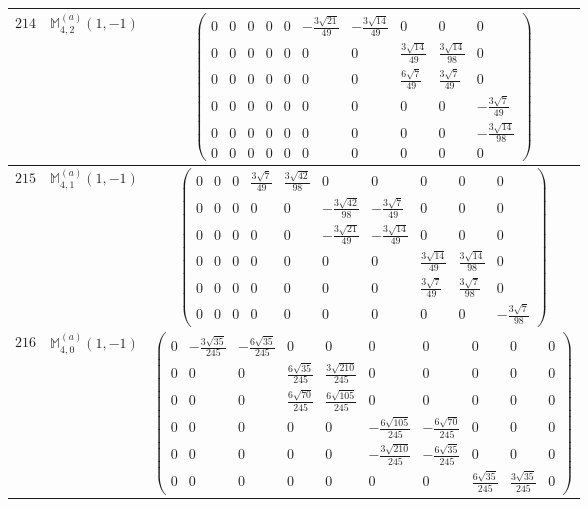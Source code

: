 \documentclass[fleqn,8pt,landscape]{jsarticle}
\begin{document}
\begin{center}
\begin{longtable}{ccc}
$ 214 $ & $ \mathbb{M}_{4,2}^{(a)}(1,-1) $ & $ \begin{pmatrix} 0 & 0 & 0 & 0 & 0 & - \frac{3 \sqrt{21}}{49} & - \frac{3 \sqrt{14}}{49} & 0 & 0 & 0 \\ 0 & 0 & 0 & 0 & 0 & 0 & 0 & \frac{3 \sqrt{14}}{49} & \frac{3 \sqrt{14}}{98} & 0 \\ 0 & 0 & 0 & 0 & 0 & 0 & 0 & \frac{6 \sqrt{7}}{49} & \frac{3 \sqrt{7}}{49} & 0 \\ 0 & 0 & 0 & 0 & 0 & 0 & 0 & 0 & 0 & - \frac{3 \sqrt{7}}{49} \\ 0 & 0 & 0 & 0 & 0 & 0 & 0 & 0 & 0 & - \frac{3 \sqrt{14}}{98} \\ 0 & 0 & 0 & 0 & 0 & 0 & 0 & 0 & 0 & 0 \end{pmatrix} $ \\ \hline
$ 215 $ & $ \mathbb{M}_{4,1}^{(a)}(1,-1) $ & $ \begin{pmatrix} 0 & 0 & 0 & \frac{3 \sqrt{7}}{49} & \frac{3 \sqrt{42}}{98} & 0 & 0 & 0 & 0 & 0 \\ 0 & 0 & 0 & 0 & 0 & - \frac{3 \sqrt{42}}{98} & - \frac{3 \sqrt{7}}{49} & 0 & 0 & 0 \\ 0 & 0 & 0 & 0 & 0 & - \frac{3 \sqrt{21}}{49} & - \frac{3 \sqrt{14}}{49} & 0 & 0 & 0 \\ 0 & 0 & 0 & 0 & 0 & 0 & 0 & \frac{3 \sqrt{14}}{49} & \frac{3 \sqrt{14}}{98} & 0 \\ 0 & 0 & 0 & 0 & 0 & 0 & 0 & \frac{3 \sqrt{7}}{49} & \frac{3 \sqrt{7}}{98} & 0 \\ 0 & 0 & 0 & 0 & 0 & 0 & 0 & 0 & 0 & - \frac{3 \sqrt{7}}{98} \end{pmatrix} $ \\ \hline
$ 216 $ & $ \mathbb{M}_{4,0}^{(a)}(1,-1) $ & $ \begin{pmatrix} 0 & - \frac{3 \sqrt{35}}{245} & - \frac{6 \sqrt{35}}{245} & 0 & 0 & 0 & 0 & 0 & 0 & 0 \\ 0 & 0 & 0 & \frac{6 \sqrt{35}}{245} & \frac{3 \sqrt{210}}{245} & 0 & 0 & 0 & 0 & 0 \\ 0 & 0 & 0 & \frac{6 \sqrt{70}}{245} & \frac{6 \sqrt{105}}{245} & 0 & 0 & 0 & 0 & 0 \\ 0 & 0 & 0 & 0 & 0 & - \frac{6 \sqrt{105}}{245} & - \frac{6 \sqrt{70}}{245} & 0 & 0 & 0 \\ 0 & 0 & 0 & 0 & 0 & - \frac{3 \sqrt{210}}{245} & - \frac{6 \sqrt{35}}{245} & 0 & 0 & 0 \\ 0 & 0 & 0 & 0 & 0 & 0 & 0 & \frac{6 \sqrt{35}}{245} & \frac{3 \sqrt{35}}{245} & 0 \end{pmatrix} $ \\ \hline

\end{longtable}
\end{center}
\end{document}
